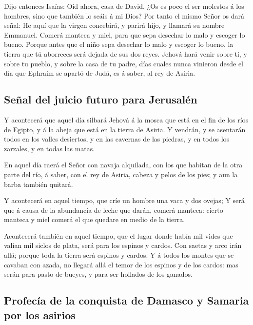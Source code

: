  Dijo entonces Isaías: Oid ahora, casa de David. ¿Os es
poco el ser molestos á los hombres, sino que también lo seáis á mi Dios?
 Por tanto el mismo Señor os dará señal: He aquí que la
virgen concebirá, y parirá hijo, y llamará su nombre Emmanuel.
 Comerá manteca y miel, para que sepa desechar lo malo y
escoger lo bueno.  Porque antes que el niño sepa desechar
lo malo y escoger lo bueno, la tierra que tú aborreces será dejada de
sus dos reyes.  Jehová hará venir sobre ti, y sobre tu
pueblo, y sobre la casa de tu padre, días cuales nunca vinieron desde el
día que Ephraim se apartó de Judá, es á saber, al rey de Asiria.

\hypertarget{seuxf1al-del-juicio-futuro-para-jerusaluxe9n}{%
\subsection{Señal del juicio futuro para
Jerusalén}\label{seuxf1al-del-juicio-futuro-para-jerusaluxe9n}}

 Y acontecerá que aquel día silbará Jehová á la mosca que
está en el fin de los ríos de Egipto, y á la abeja que está en la tierra
de Asiria.  Y vendrán, y se asentarán todos en los valles
desiertos, y en las cavernas de las piedras, y en todos los zarzales, y
en todas las matas.

 En aquel día raerá el Señor con navaja alquilada, con los
que habitan de la otra parte del río, á saber, con el rey de Asiria,
cabeza y pelos de los pies; y aun la barba también quitará.

 Y acontecerá en aquel tiempo, que críe un hombre una vaca
y dos ovejas;  Y será que á causa de la abundancia de leche
que darán, comerá manteca: cierto manteca y miel comerá el que quedare
en medio de la tierra.

 Acontecerá también en aquel tiempo, que el lugar donde
había mil vides que valían mil siclos de plata, será para los espinos y
cardos.  Con saetas y arco irán allá; porque toda la tierra
será espinos y cardos.  Y á todos los montes que se cavaban
con azada, no llegará allá el temor de los espinos y de los cardos: mas
serán para pasto de bueyes, y para ser hollados de los ganados.

\hypertarget{profecuxeda-de-la-conquista-de-damasco-y-samaria-por-los-asirios}{%
\subsection{Profecía de la conquista de Damasco y Samaria por los
asirios}\label{profecuxeda-de-la-conquista-de-damasco-y-samaria-por-los-asirios}}

